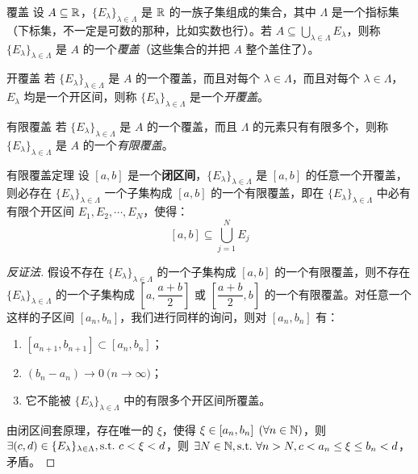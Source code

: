 \begin{definition}{覆盖}
	设 $A \subseteq \mathbb R$，$\{E_\lambda\}_{\lambda \in \Lambda}$ 是 $\mathbb R$ 的一族子集组成的集合，其中 $\Lambda$ 是一个指标集（下标集，不一定是可数的那种，比如实数也行）。若 $A \subseteq \bigcup\limits_{\lambda \in \Lambda} E_\lambda$，则称 $\{E_\lambda\}_{\lambda \in \Lambda}$ 是 $A$ 的一个\emph{覆盖}（这些集合的并把 $A$ 整个盖住了）。
\end{definition}

\begin{definition}{开覆盖}
	若 $\{E_\lambda\}_{\lambda \in \Lambda}$ 是 $A$ 的一个覆盖，而且对每个 $\lambda \in \Lambda$，而且对每个 $\lambda \in \Lambda$，$E_\lambda$ 均是一个开区间，则称 $\{E_\lambda\}_{\lambda \in \Lambda}$ 是一个\emph{开覆盖}。
\end{definition}

\begin{definition}{有限覆盖}
	若 $\{E_\lambda\}_{\lambda \in \Lambda}$ 是 $A$ 的一个覆盖，而且 $\Lambda$ 的元素只有有限多个，则称 $\{E_\lambda\}_{\lambda \in \Lambda}$ 是 $A$ 的一个\emph{有限覆盖}。
\end{definition}

\begin{theorem}{有限覆盖定理}
	设 $[a, b]$ 是一个\textbf{闭区间}，$\{E_\lambda\}_{\lambda \in \Lambda}$ 是 $[a, b]$ 的任意一个开覆盖，则必存在 $\{E_\lambda\}_{\lambda \in \Lambda}$ 一个子集构成 $[a, b]$ 的一个有限覆盖，即在 $\{E_\lambda\}_{\lambda \in \Lambda}$ 中必有有限个开区间 $E_1, E_2, \cdots, E_N$，使得：
	$$
	[a, b] \subseteq \bigcup\limits_{j = 1}^N E_j
	$$
\end{theorem}

\begin{proof}[反证法]
	假设不存在 $\{E_\lambda\}_{\lambda \in \Lambda}$ 的一个子集构成 $[a, b]$ 的一个有限覆盖，则不存在 $\{E_\lambda\}_{\lambda \in \Lambda}$ 的一个子集构成 $\left[ a, \dfrac{a + b}{2} \right]$ 或 $\left[ \dfrac{a + b}{2}, b \right]$ 的一个有限覆盖。对任意一个这样的子区间 $[a_n, b_n]$，我们进行同样的询问，则对 $[a_n, b_n]$ 有：

	\begin{enumerate}
		\item $[a_{n + 1}, b_{n + 1}] \subset [a_n, b_n]$；
		\item $(b_n - a_n) \rightarrow 0 \pod{n \rightarrow \infty}$；
		\item 它不能被 $\{E_\lambda\}_{\lambda \in \Lambda}$ 中的有限多个开区间所覆盖。
	\end{enumerate}

	由闭区间套原理，存在唯一的 $\xi$，使得 $\xi \in [a_n, b_n] \pod{\forall n \in \mathbb N}$，则 $\exists (c, d) \in \{E_\lambda\}_{\lambda \in \Lambda}, \text{s.t.~} c < \xi < d$，则 $\exists N \in \mathbb N, \text{s.t.~} \forall n > N, c < a_n \le \xi \le b_n < d$，矛盾。
\end{proof}

